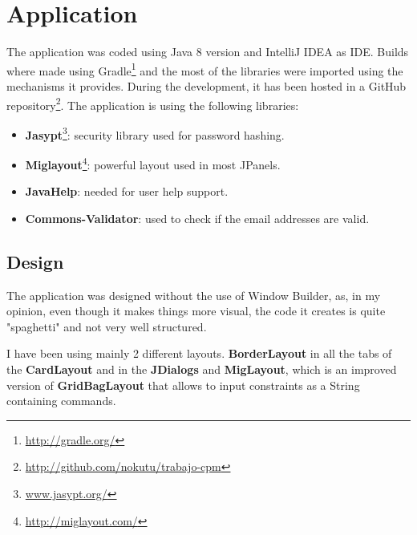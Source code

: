 \documentclass[11pt]{article}
\begin{document}
	\section{Application}
	The application was coded using Java 8 version and IntelliJ IDEA as IDE. Builds where made using Gradle\footnote{\url{http://gradle.org/}} and the most of the libraries were imported using the mechanisms it provides. During the development, it has been hosted in a GitHub repository\footnote{\url{http://github.com/nokutu/trabajo-cpm}}. The application is using the following libraries:
	\begin{itemize}
	   	\item \textbf{Jasypt}\footnote{\url{www.jasypt.org/}}: security library used for password hashing.
	   	\item \textbf{Miglayout}\footnote{\url{http://miglayout.com/}}: powerful layout used in most JPanels.
	   	\item \textbf{JavaHelp}: needed for user help support.
	   	\item \textbf{Commons-Validator}: used to check if the email addresses are valid.
	\end{itemize}
	\subsection{Design}
	The application was designed without the use of Window Builder, as, in my opinion, even though it makes things more visual, the code it creates is quite "spaghetti" and not very well structured.
   
	I have been using mainly 2 different layouts. \textbf{BorderLayout} in all the tabs of the \textbf{CardLayout} and in the \textbf{JDialogs} and \textbf{MigLayout}, which is an improved  version of \textbf{GridBagLayout} that allows to input constraints as a String containing commands.
   
\end{document}
